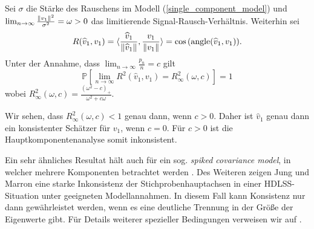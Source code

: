 \begin{thm}
\label{pca_inconsistency_ratio}
Sei $\sigma$ die Stärke des Rauschens im Modell (\ref{single_component_model}) und $\lim_{n \rightarrow \infty} \frac{\left\lVert v_1 \right\rVert^{2}}{\sigma^2} = \omega > 0$ das limitierende Signal-Rausch-Verhältnis. Weiterhin sei 
$$R(\widehat{v}_1, v_1) = \langle \frac{\widehat{v}_1}{\left\lVert \widehat{v}_1 \right\rVert}, \frac{v_1}{\left\lVert v_1 \right\rVert} \rangle = \cos{(\operatorname{angle}(\widehat{v}_1, v_1))}.$$
Unter der Annahme, dass $\lim_{n \rightarrow \infty} \frac{p_n}{n} = c$ gilt
$$\mathbb{P}\left[\lim_{n \rightarrow \infty} R^2(\widehat{v}_1, v_1) = R_{\infty}^2(\omega, c)\right] = 1$$
wobei $R_{\infty}^2(\omega, c) = \frac{(\omega^2 - c)_+}{\omega^2 + c\omega}$.
\end{thm}

Wir sehen, dass $R_{\infty}^2(\omega, c) < 1$ genau dann, wenn $c > 0$. Daher ist $\widehat{v}_1$ genau dann ein konsistenter Schätzer für $v_1$, wenn $c = 0$. Für $c > 0$ ist die Hauptkomponentenanalyse somit inkonsistent. 

Ein sehr ähnliches Resultat hält auch für ein sog. \textit{spiked covariance model}, in welcher mehrere Komponenten betrachtet werden \cite{paul}. Des Weiteren zeigen Jung und Marron eine starke Inkonsistenz der Stichprobenhauptachsen in einer HDLSS-Situation unter geeigneten Modellannahmen. In diesem Fall kann Konsistenz nur dann gewährleistet werden, wenn es eine deutliche Trennung in der Größe der Eigenwerte gibt. Für Details weiterer spezieller Bedingungen verweisen wir auf \cite{jung}.

